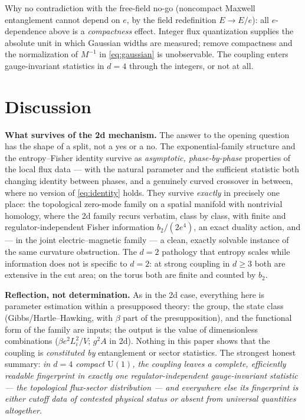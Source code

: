 \documentclass[11pt]{article}
\theoremstyle{remark}
\theoremstyle{plain}
\begin{document}
Why no contradiction with the free-field no-go (noncompact Maxwell entanglement cannot depend on $e$, by the field redefinition $E \to E/e$): all $e$-dependence above is a \emph{compactness} effect. Integer flux quantization supplies the absolute unit in which Gaussian widths are measured; remove compactness and the normalization of $M^{-1}$ in \eqref{eq:gaussian} is unobservable. The coupling enters gauge-invariant statistics in $d = 4$ through the integers, or not at all.

\section{Discussion}\label{sec:discussion}

\textbf{What survives of the 2d mechanism.} The answer to the opening question has the shape of a split, not a yes or a no. The exponential-family structure and the entropy--Fisher identity survive as \emph{asymptotic, phase-by-phase} properties of the local flux data --- with the natural parameter and the sufficient statistic both changing identity between phases, and a genuinely curved crossover in between, where no version of \eqref{eq:identity} holds. They survive \emph{exactly} in precisely one place: the topological zero-mode family on a spatial manifold with nontrivial homology, where the 2d family recurs verbatim, class by class, with finite and regulator-independent Fisher information $b_2/(2e^4)$, an exact duality action, and --- in the joint electric--magnetic family --- a clean, exactly solvable instance of the same curvature obstruction. The $d = 2$ pathology that entropy scales while information does not is specific to $d = 2$: at strong coupling in $d \geq 3$ both are extensive in the cut area; on the torus both are finite and counted by $b_2$.

\textbf{Reflection, not determination.} As in the 2d case, everything here is parameter estimation within a presupposed theory: the group, the state class (Gibbs/Hartle--Hawking, with $\beta$ part of the presupposition), and the functional form of the family are inputs; the output is the value of dimensionless combinations ($\beta e^2 L_i^2/V$; $g^2 A$ in 2d). Nothing in this paper shows that the coupling is \emph{constituted by} entanglement or sector statistics. The strongest honest summary: \emph{in $d = 4$ compact $\mathrm{U}(1)$, the coupling leaves a complete, efficiently readable fingerprint in exactly one regulator-independent gauge-invariant statistic --- the topological flux-sector distribution --- and everywhere else its fingerprint is either cutoff data of contested physical status or absent from universal quantities altogether.}
\end{document}
